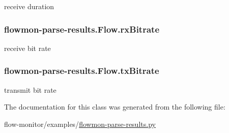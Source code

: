 receive duration 

\subsubsection[{\texorpdfstring{rx\+Bitrate}{rxBitrate}}]{\setlength{\rightskip}{0pt plus 5cm}flowmon-\/parse-\/results.\+Flow.\+rx\+Bitrate}\hypertarget{classflowmon-parse-results_1_1Flow_a5e0f7c959627122f01ba981c858d6c53}{}\label{classflowmon-parse-results_1_1Flow_a5e0f7c959627122f01ba981c858d6c53}


receive bit rate 

\subsubsection[{\texorpdfstring{tx\+Bitrate}{txBitrate}}]{\setlength{\rightskip}{0pt plus 5cm}flowmon-\/parse-\/results.\+Flow.\+tx\+Bitrate}\hypertarget{classflowmon-parse-results_1_1Flow_a20b8d5d879b4fbd24d590a7f18510016}{}\label{classflowmon-parse-results_1_1Flow_a20b8d5d879b4fbd24d590a7f18510016}


transmit bit rate 



The documentation for this class was generated from the following file\+:\begin{DoxyCompactItemize}
\item 
flow-\/monitor/examples/\hyperlink{flowmon-parse-results_8py}{flowmon-\/parse-\/results.\+py}\end{DoxyCompactItemize}
